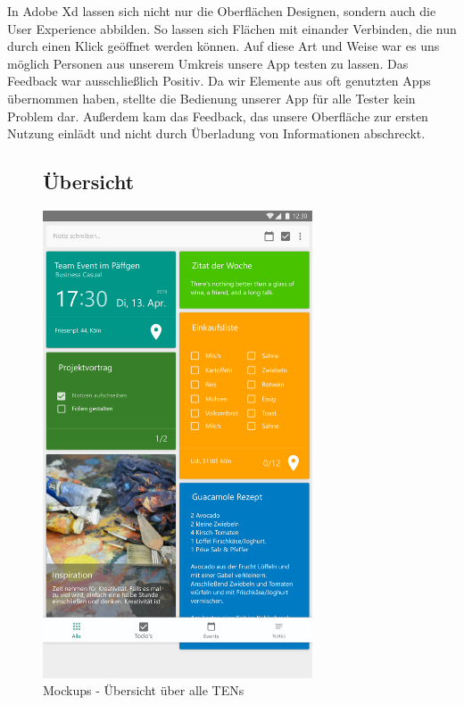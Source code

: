 In Adobe Xd lassen sich nicht nur die Oberflächen Designen, sondern auch die User Experience abbilden. So lassen sich Flächen mit einander Verbinden, die nun durch einen Klick geöffnet werden können. Auf diese Art und Weise war es uns möglich Personen aus unserem Umkreis unsere App testen zu lassen. Das Feedback war ausschließlich Positiv. Da wir Elemente aus oft genutzten Apps übernommen haben, stellte die Bedienung unserer App für alle Tester kein Problem dar. Außerdem kam das Feedback, das unsere Oberfläche zur ersten Nutzung einlädt und nicht durch Überladung von Informationen abschreckt.
\begin{figure}[H]
	\subsection*{Übersicht}
	\centering
	\includegraphics[width=8cm]{img/OverviewActivity.pdf}
	\caption{Mockups - Übersicht über alle TENs}
	\label{img:OverviewActivity}
\end{figure}

